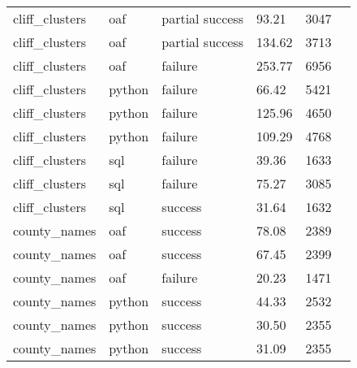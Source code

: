 \begin{longtable}{lp{1.8cm}p{1.8cm}p{1.8cm}p{1.8cm}p{1.8cm}}
    cliff\_clusters            & oaf                          & partial success  & 93.21                         & 3047            \\
    cliff\_clusters            & oaf                          & partial success  & 134.62                        & 3713            \\
    cliff\_clusters            & oaf                          & failure          & 253.77                        & 6956            \\
    cliff\_clusters            & python                       & failure          & 66.42                         & 5421            \\
    cliff\_clusters            & python                       & failure          & 125.96                        & 4650            \\
    cliff\_clusters            & python                       & failure          & 109.29                        & 4768            \\
    cliff\_clusters            & sql                          & failure          & 39.36                         & 1633            \\
    cliff\_clusters            & sql                          & failure          & 75.27                         & 3085            \\
    cliff\_clusters            & sql                          & success          & 31.64                         & 1632            \\
    county\_names              & oaf                          & success          & 78.08                         & 2389            \\
    county\_names              & oaf                          & success          & 67.45                         & 2399            \\
    county\_names              & oaf                          & failure          & 20.23                         & 1471            \\
    county\_names              & python                       & success          & 44.33                         & 2532            \\
    county\_names              & python                       & success          & 30.50                         & 2355            \\
    county\_names              & python                       & success          & 31.09                         & 2355            \\

\end{longtable}
